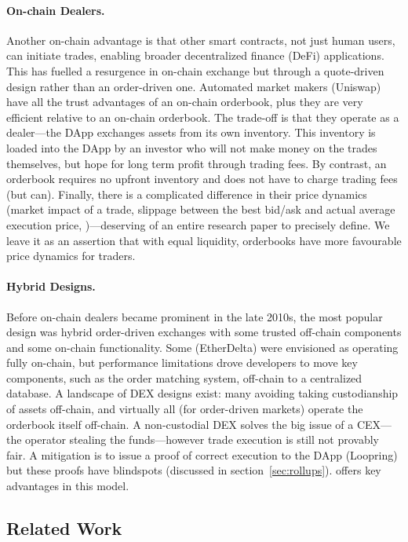 \paragraph{On-chain Dealers.} Another on-chain advantage is that other smart contracts, not just human users, can initiate trades, enabling broader decentralized finance (DeFi) applications. This has fuelled a resurgence in on-chain exchange but through a quote-driven design rather than an order-driven one. Automated market makers  (\eg Uniswap) have all the trust advantages of an on-chain orderbook, plus they are very efficient relative to an on-chain orderbook. The trade-off is that they operate as a dealer---the DApp exchanges assets from its own inventory. This inventory is loaded into the DApp by an investor who will not make money on the trades themselves, but hope for long term profit through trading fees. By contrast, an orderbook requires no upfront inventory and does not have to charge trading fees (but can). Finally, there is a complicated difference in their price dynamics (\eg market impact of a trade, slippage between the best bid/ask and actual average execution price, \etc)---deserving of an entire research paper to precisely define. We leave it as an assertion that with equal liquidity, orderbooks have more favourable price dynamics for traders.

\paragraph{Hybrid Designs.} Before on-chain dealers became prominent in the late 2010s, the most popular design was hybrid order-driven exchanges with some trusted off-chain components and some on-chain functionality. Some (\eg EtherDelta) were envisioned as operating fully on-chain, but performance limitations drove developers to move key components, such as the order matching system, off-chain to a centralized database. A landscape of DEX designs exist: many avoiding taking custodianship of assets off-chain, and virtually all (for order-driven markets) operate the orderbook itself off-chain. A non-custodial DEX solves the big issue of a CEX---the operator stealing the funds---however trade execution is still not provably fair. A mitigation is to issue a proof of correct execution to the DApp (\eg Loopring) but these proofs have blindspots (discussed in section~\ref{sec:rollups}). \cm offers key advantages in this model. 

\subsection{Related Work}

